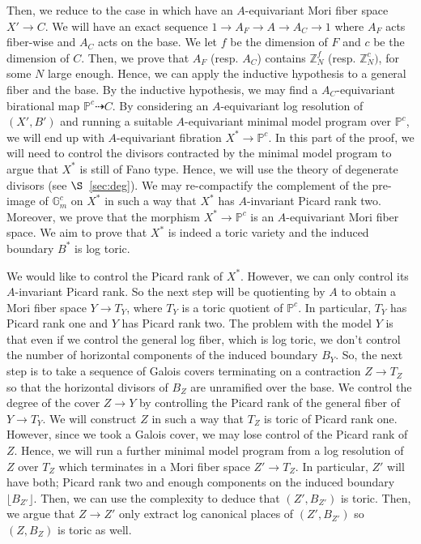 \documentclass{amsart}
\newcommand{\pp}{\mathbb{P}}
\newcommand{\zz}{\mathbb{Z}}
\theoremstyle{remark}
\numberwithin{equation}{section}
\begin{document}
Then, we reduce to the case in which have an $A$-equivariant Mori fiber space $X'\rightarrow C$.
We will have an exact sequence $1\rightarrow A_F\rightarrow A\rightarrow A_C\rightarrow 1$ where $A_F$ acts fiber-wise and $A_C$ acts on the base.
We let $f$ be the dimension of $F$ and $c$ be the dimension of $C$.
Then, we prove that $A_F$ (resp. $A_C$) contains $\zz_N^f$ (resp. $\zz_N^c)$, for some $N$ large enough.
Hence, we can apply the inductive hypothesis to a general fiber and the base.
By the inductive hypothesis, we may find a $A_C$-equivariant birational map
$\pp^c\dashrightarrow C$.
By considering an $A$-equivariant log resolution of $(X',B')$ and running a suitable $A$-equivariant minimal model program over $\pp^c$, we will end up with $A$-equivariant fibration $X^*\rightarrow \pp^c$.
In this part of the proof, we will need to control the divisors contracted by the minimal model program to argue that $X^*$ is still of Fano type.
Hence, we will use the theory of degenerate divisors (see $\S$~\ref{sec:deg}).
We may re-compactify the complement of the pre-image of $\mathbb{G}_m^c$ on $X^*$ in such a way that $X^*$ has $A$-invariant Picard rank two.
Moreover, we prove that the morphism $X^*\rightarrow \pp^c$ is an $A$-equivariant Mori fiber space.
We aim to prove that $X^*$ is indeed a toric variety
and the induced boundary $B^*$ is log toric.

We would like to control the Picard rank of $X^*$.
However, we can only control its $A$-invariant Picard rank.
So the next step will be quotienting by $A$ to obtain a
Mori fiber space $Y\rightarrow T_Y$,
where $T_Y$ is a toric quotient of $\pp^c$.
In particular, $T_Y$ has Picard rank one and $Y$ has Picard rank two.
The problem with the model $Y$ 
is that even if we control the general log fiber, which is log toric, we don't control the number of horizontal components of the induced boundary $B_Y$.
So, the next step is to take a sequence of Galois covers terminating on a contraction $Z\rightarrow T_Z$ 
so that the horizontal divisors of $B_Z$ are unramified over the base.
We control the degree of the cover $Z\rightarrow Y$ by controlling the Picard rank of the general fiber of $Y\rightarrow T_Y$.
We will construct $Z$ in such a way that $T_Z$ is toric of Picard rank one.
However, since we took a Galois cover, we may lose control of the Picard rank of $Z$.
Hence, we will run a further minimal model program from a log resolution of $Z$ over $T_Z$ which terminates in a Mori fiber space $Z'\rightarrow T_Z$.
In particular, $Z'$ will have both; Picard rank two and enough components on the induced boundary $\lfloor B_{Z'}\rfloor$. Then, we can use the complexity to deduce that
$(Z',B_{Z'})$ is toric.
Then, we argue that $Z\rightarrow Z'$ only extract log canonical places of $(Z',B_{Z'})$ so $(Z,B_Z)$ is toric as well.
\end{document}
